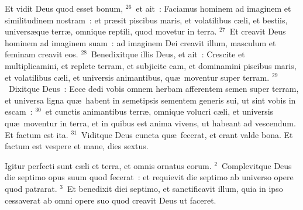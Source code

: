  Et vidit Deus quod esset bonum,
${}^{26}$~et ait~: Faciamus hominem ad imaginem et similitudinem nostram~: et pr\ae sit piscibus maris, et volatilibus c\ae li, et bestiis, univers\ae que terr\ae , omnique reptili, quod movetur in terra.
${}^{27}$~Et creavit Deus hominem ad imaginem suam~: ad imaginem Dei creavit illum, masculum et feminam creavit eos.
${}^{28}$~Benedixitque illis Deus, et ait~: Crescite et multiplicamini, et replete terram, et subjicite eam, et dominamini piscibus maris, et volatilibus c\ae li, et universis animantibus, qu\ae\ moventur super terram.
${}^{29}$~Dixitque Deus~: Ecce dedi vobis omnem herbam afferentem semen super terram, et universa ligna qu\ae\ habent in semetipsis sementem generis sui, ut sint vobis in escam~:
${}^{30}$~et cunctis animantibus terr\ae , omnique volucri c\ae li, et universis qu\ae\ moventur in terra, et in quibus est anima vivens, ut habeant ad vescendum. Et factum est ita.
${}^{31}$~Viditque Deus cuncta qu\ae\ fecerat, et erant valde bona. Et factum est vespere et mane, dies sextus.

\lettrine[lines=3,image=true,loversize=0.05,lraise=-0.03]{I}{}gitur perfecti sunt c\ae li et terra, et omnis ornatus eorum.
${}^{2}$~Complevitque Deus die septimo opus suum quod fecerat~: et requievit die septimo ab universo opere quod patrarat.
${}^{3}$~Et benedixit diei septimo, et sanctificavit illum, quia in ipso cessaverat ab omni opere suo quod creavit Deus ut faceret.


